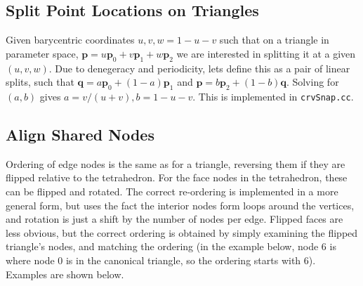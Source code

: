 \documentclass{article}
\begin{document}
\subsection{Split Point Locations on Triangles}
Given barycentric coordinates $u,v,w=1-u-v$ such that on a triangle in parameter space, $\mathbf{p} = u\mathbf{p}_0 + v\mathbf{p}_1 + w\mathbf{p}_2$ we are interested in splitting it at a given $(u,v,w)$. Due to denegeracy and periodicity, lets define this as a pair of linear splits, such that $ \mathbf{q} = a\mathbf{p}_0 + (1-a)\mathbf{p}_1 $ and $\mathbf{p} = b\mathbf{p}_2 + (1-b)\mathbf{q}$. Solving for $(a,b)$ gives $ a = v/(u+v), b = 1-u-v$. This is implemented in \texttt{crvSnap.cc}.

\subsection{Align Shared Nodes}
Ordering of edge nodes is the same as for a triangle, reversing them if they are flipped relative to the tetrahedron. For the face nodes in the tetrahedron, these can be flipped and rotated. The correct re-ordering is implemented in a more general form, but uses the fact the interior nodes form loops around the vertices, and rotation is just a shift by the number of nodes per edge. Flipped faces are less obvious, but the correct ordering is obtained by simply examining the flipped triangle's nodes, and matching the ordering (in the example below, node 6 is where node 0 is in the canonical triangle, so the ordering starts with 6). Examples are shown below.
\end{document}
